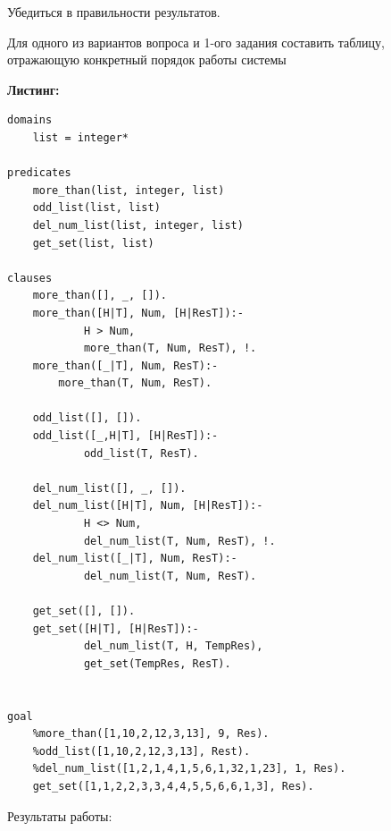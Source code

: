 \documentclass[12pt, a4paper]{extarticle}
\begin{document}
Убедиться в правильности результатов. 

Для одного из вариантов вопроса и 1-ого задания  составить таблицу, отражающую конкретный порядок работы системы



\hfill

\textbf{Листинг:}

\begin{lstlisting}
domains
	list = integer*

predicates
	more_than(list, integer, list)
	odd_list(list, list)
	del_num_list(list, integer, list)
	get_set(list, list)

clauses
	more_than([], _, []).
	more_than([H|T], Num, [H|ResT]):-
			H > Num,
			more_than(T, Num, ResT), !.
	more_than([_|T], Num, ResT):-
		more_than(T, Num, ResT).

	odd_list([], []).
	odd_list([_,H|T], [H|ResT]):-
			odd_list(T, ResT).

	del_num_list([], _, []).
	del_num_list([H|T], Num, [H|ResT]):-
			H <> Num,
			del_num_list(T, Num, ResT), !.
	del_num_list([_|T], Num, ResT):-
			del_num_list(T, Num, ResT).

	get_set([], []).
	get_set([H|T], [H|ResT]):-
			del_num_list(T, H, TempRes),
			get_set(TempRes, ResT).


goal
	%more_than([1,10,2,12,3,13], 9, Res).
	%odd_list([1,10,2,12,3,13], Rest).
	%del_num_list([1,2,1,4,1,5,6,1,32,1,23], 1, Res).
	get_set([1,1,2,2,3,3,4,4,5,5,6,6,1,3], Res).
\end{lstlisting}
\par
Результаты работы:\par
\begin{figure}[h!]
	\begin{minipage}[h]{0.48\linewidth}
	\end{minipage}
	\hfill
	\begin{minipage}[h]{0.48\linewidth}
	\end{minipage}
\end{figure}\par
\end{document}
